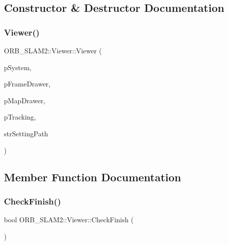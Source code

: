\subsection{Constructor \& Destructor Documentation}
\mbox{\label{class_o_r_b___s_l_a_m2_1_1_viewer_abe1f6eab6a1976e589f37a14b80c448b}} 
\subsubsection{\texorpdfstring{Viewer()}{Viewer()}}
{\footnotesize\ttfamily O\+R\+B\+\_\+\+S\+L\+A\+M2\+::\+Viewer\+::\+Viewer (\begin{DoxyParamCaption}\item[{\mbox{\hyperlink{class_o_r_b___s_l_a_m2_1_1_system}{System}} $\ast$}]{p\+System,  }\item[{\mbox{\hyperlink{class_o_r_b___s_l_a_m2_1_1_frame_drawer}{Frame\+Drawer}} $\ast$}]{p\+Frame\+Drawer,  }\item[{\mbox{\hyperlink{class_o_r_b___s_l_a_m2_1_1_map_drawer}{Map\+Drawer}} $\ast$}]{p\+Map\+Drawer,  }\item[{\mbox{\hyperlink{class_o_r_b___s_l_a_m2_1_1_tracking}{Tracking}} $\ast$}]{p\+Tracking,  }\item[{const string \&}]{str\+Setting\+Path }\end{DoxyParamCaption})}



\subsection{Member Function Documentation}
\mbox{\label{class_o_r_b___s_l_a_m2_1_1_viewer_ad8085f7f51887cea273e0f6357137439}} 
\subsubsection{\texorpdfstring{Check\+Finish()}{CheckFinish()}}
{\footnotesize\ttfamily bool O\+R\+B\+\_\+\+S\+L\+A\+M2\+::\+Viewer\+::\+Check\+Finish (\begin{DoxyParamCaption}{ }\end{DoxyParamCaption})\hspace{0.3cm}{\ttfamily [private]}}

